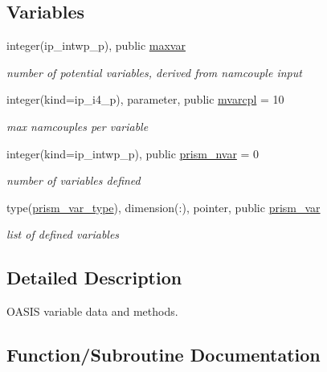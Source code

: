 \subsection*{Variables}
\begin{DoxyCompactItemize}
\item 
integer(ip\+\_\+intwp\+\_\+p), public \hyperlink{namespacemod__oasis__var_a151c4be67882fc8d02f66e4a1822b692}{maxvar}
\begin{DoxyCompactList}\small\item\em number of potential variables, derived from namcouple input \end{DoxyCompactList}\item 
integer(kind=ip\+\_\+i4\+\_\+p), parameter, public \hyperlink{namespacemod__oasis__var_a687d6dce16699f36ae3a67accfdba3a9}{mvarcpl} = 10
\begin{DoxyCompactList}\small\item\em max namcouples per variable \end{DoxyCompactList}\item 
integer(kind=ip\+\_\+intwp\+\_\+p), public \hyperlink{namespacemod__oasis__var_a095f8ad84e6afbcbe1744d4a9f924e08}{prism\+\_\+nvar} = 0
\begin{DoxyCompactList}\small\item\em number of variables defined \end{DoxyCompactList}\item 
type(\hyperlink{structmod__oasis__var_1_1prism__var__type}{prism\+\_\+var\+\_\+type}), dimension(\+:), pointer, public \hyperlink{namespacemod__oasis__var_ae66c490437c2960d795fbd3d2c773a0a}{prism\+\_\+var}
\begin{DoxyCompactList}\small\item\em list of defined variables \end{DoxyCompactList}\end{DoxyCompactItemize}


\subsection{Detailed Description}
O\+A\+S\+IS variable data and methods. 

\subsection{Function/\+Subroutine Documentation}
\mbox{\label{namespacemod__oasis__var_a7d16403015304fadc15624773f87d2a0}} 
